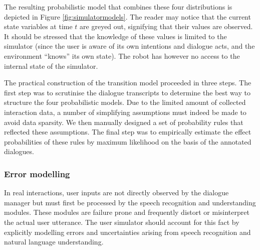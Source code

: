 The resulting probabilistic model that combines these four distributions is depicted in Figure \ref{fig:simulatormodels}. The reader may notice that the current state variables at time $t$ are greyed out, signifying that their values are observed.  It should be stressed that the knowledge of these values is limited to the simulator (since the user is aware of its own intentions and dialogue acts, and the environment ``knows'' its own state). The robot has however no access to the internal state of the simulator. 

The practical construction of the transition model proceeded in three steps.  The first step was to scrutinise the dialogue transcripts to determine the best way to structure the four probabilistic models. Due to the limited amount of collected interaction data, a number of simplifying assumptions must indeed be made to avoid data sparsity. We then manually designed a set of probability rules that reflected these assumptions.  The final step was to empirically estimate the effect probabilities of these rules by maximum likelihood on the basis of the annotated dialogues. 

\subsubsection*{Error modelling}

In real interactions, user inputs are not directly observed by the dialogue manager but must first be processed by the speech recognition and understanding modules.  These modules are failure prone and frequently distort or misinterpret the actual user utterance. The user simulator should account for this fact by explicitly modelling errors and uncertainties arising from speech recognition and natural language understanding. 

